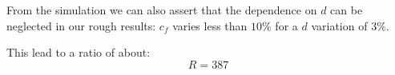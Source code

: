 \documentclass[main.tex]{subfiles}
\begin{document}
From the simulation we can also assert that the dependence on $d$ can be neglected in our rough results: $c_f$ varies less than $10\%$ for a $d$ variation of $3\%$.

This lead to a ratio of about:
\begin{equation}
  R = 387
\end{equation}


\end{document}
